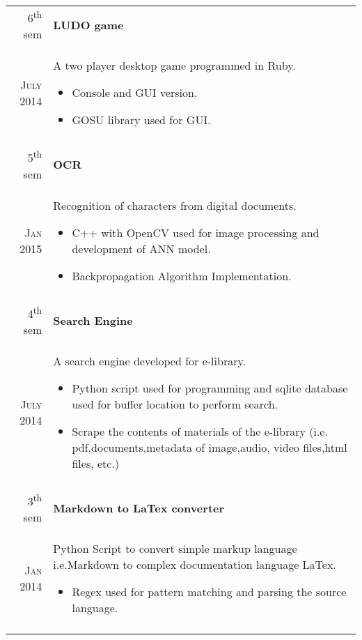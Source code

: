\documentclass[a4paper,10pt]{article}
\begin{document}
\begin{tabular}{r|p{11cm}}
6\textsuperscript{th} sem & \textbf{LUDO game}\\ \textsc{July 2014} & \small{A two player desktop game programmed in Ruby.
\footnotesize{
\begin{itemize}
\item Console and GUI version.
\item GOSU library used for GUI.
\end{itemize}
}}\\\multicolumn{2}{c}{} \\

5\textsuperscript{th} sem & \textbf{OCR}\\ \textsc{Jan 2015} & \small{Recognition of characters from digital documents.
\footnotesize{
\begin{itemize}
\item C++ with OpenCV used for image processing and development of ANN model.
\item Backpropagation Algorithm Implementation.
\end{itemize}
}}\\\multicolumn{2}{c}{} \\

4\textsuperscript{th} sem & \textbf{Search Engine}\\ \textsc{July 2014} & \small{A search engine developed for e-library.
\footnotesize{
\begin{itemize}
\item Python script used for programming and sqlite database used for buffer location to perform search.
\item Scrape the contents of materials of the e-library (i.e. pdf,documents,metadata of image,audio, video files,html files, etc.) 
\end{itemize}
}}\\\multicolumn{2}{c}{} \\

3\textsuperscript{th} sem & \textbf{Markdown to LaTex converter}\\ \textsc{Jan 2014} & \small{Python Script to convert simple markup language i.e.Markdown to complex documentation language LaTex.
\footnotesize{
\begin{itemize}
\item Regex used for pattern matching and parsing the source language.
\end{itemize}
}}\\\multicolumn{2}{c}{} \\
\end{tabular}
\end{document}
